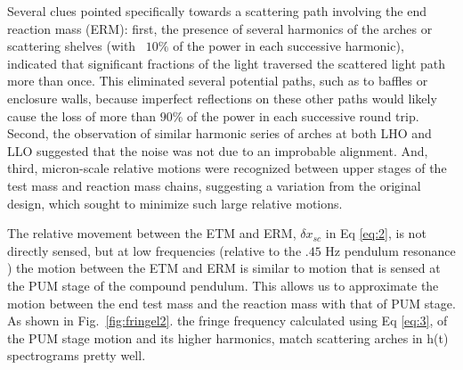 \documentclass[12pt]{iopart}
\begin{document}

 
Several clues pointed specifically towards a scattering path involving the end reaction mass (ERM): first, the presence of several harmonics of the arches or scattering shelves (with ~$10\%$ of the power in each successive harmonic), indicated that significant fractions of the light traversed the scattered light path more than once. This eliminated several potential paths, such as to baffles or enclosure walls, because imperfect reflections on these other paths would likely cause the loss of more than $90\%$ of the power in each successive round trip. Second, the observation of similar harmonic series of arches at both LHO and LLO suggested that the noise was not due to an improbable alignment. And, third, micron-scale relative motions were recognized between upper stages of the test mass and reaction mass chains, suggesting a variation from the original design, which sought to minimize such large relative motions. 
 
The relative movement between the ETM and ERM, ${\delta x_{sc}}$ in Eq \ref{eq:2}, is not directly sensed, but at low frequencies (relative to the $.45$ Hz pendulum resonance ) the motion between the ETM and ERM is similar to motion that is sensed at the PUM stage of the compound pendulum. This allows us to approximate the motion between the end test mass and the reaction mass with that of PUM stage.  As shown in Fig.~\ref{fig:fringel2}. the fringe frequency calculated using Eq \ref{eq:3}, of the PUM stage motion and its higher harmonics, match scattering arches in h(t) spectrograms pretty well. 



\par
\end{document}
